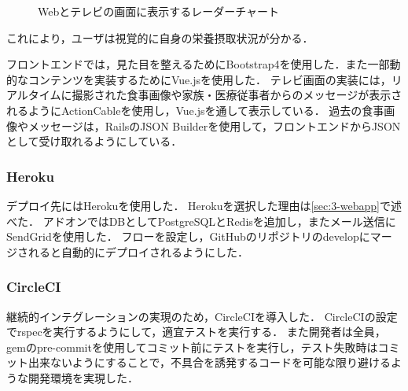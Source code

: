 \documentclass[../report]{subfiles}
\begin{document}
\begin{figure}[htbp]
    \begin{center}
        \caption{Webとテレビの画面に表示するレーダーチャート}
        \label{fig:6-radarchart}
    \end{center}
\end{figure}

これにより，ユーザは視覚的に自身の栄養摂取状況が分かる．

フロントエンドでは，見た目を整えるためにBootstrap4を使用した．また一部動的なコンテンツを実装するためにVue.jsを使用した．
テレビ画面の実装には，リアルタイムに撮影された食事画像や家族・医療従事者からのメッセージが表示されるようにActionCableを使用し，Vue.jsを通して表示している．
過去の食事画像やメッセージは，RailsのJSON Builderを使用して，フロントエンドからJSONとして受け取れるようにしている．

\subsubsection{Heroku}
デプロイ先にはHerokuを使用した．
Herokuを選択した理由は\ref{sec:3-webapp}で述べた．
アドオンではDBとしてPostgreSQLとRedisを追加し，またメール送信にSendGridを使用した．
フローを設定し，GitHubのリポジトリのdevelopにマージされると自動的にデプロイされるようにした．

\subsubsection{CircleCI}
継続的インテグレーションの実現のため，CircleCIを導入した．
CircleCIの設定でrspecを実行するようにして，適宜テストを実行する．
また開発者は全員，gemのpre-commitを使用してコミット前にテストを実行し，テスト失敗時はコミット出来ないようにすることで，不具合を誘発するコードを可能な限り避けるような開発環境を実現した．
\end{document}
